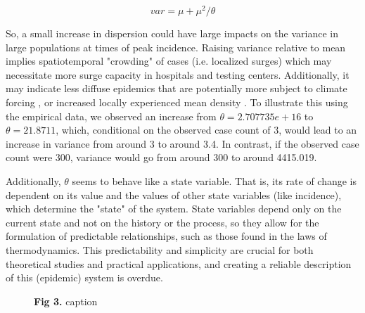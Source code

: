 \documentclass[10pt,letterpaper]{article}
\begin{document}
\begin{equation}
var = \mu + \mu^2/\theta  
\end{equation}

So, a small increase in dispersion could have large impacts on the variance in large populations at times of peak incidence. 
Raising variance relative to mean implies spatiotemporal "crowding" of cases (i.e. localized surges) which may necessitate more surge capacity in hospitals and testing centers. 
Additionally, it may indicate less diffuse epidemics that are potentially more subject to climate forcing \cite{dalziel_urbanization_2018}, or increased locally experienced mean density \cite{lloyd_mean_1967}. To illustrate this using the empirical data, we observed an increase from \begin{math}\theta = 2.707735e+16\end{math} to \begin{math}\theta = 21.8711\end{math}, which, conditional on the observed case count of 3, would lead to an increase in variance from around 3 to around 3.4. In contrast, if the observed case count were 300, variance would go from around 300 to around 4415.019.

Additionally, \begin{math}\theta\end{math} seems to behave like a state variable. That is, its rate of change is dependent on its value and the values of other state variables (like incidence), which determine the "state" of the system. State variables depend only on the current state and not on the history or the process, so they allow for the formulation of predictable relationships, such as those found in the laws of thermodynamics. This predictability and simplicity are crucial for both theoretical studies and practical applications, and creating a reliable description of this (epidemic) system is overdue.

\begin{figure}[!h]
\caption{{\bf Fig 3.}
caption
}
\label{fig3}
\end{figure}
\end{document}
